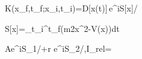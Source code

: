K(x_f,t_f;x_i,t_i)=\int\mathcal D[x(t)]\,e^{iS[x]/\hbar}

S[x]=\int_{t_i}^{t_f}\left(\frac m2\dot x^2-V(x)\right)dt

A\simeq e^{iS_1/\hbar}+r e^{iS_2/\hbar},\qquad I_{\rm rel}=
